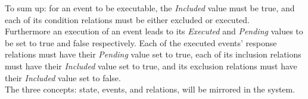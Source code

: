 To sum up: for an event to be executable, the \textit{Included} value must be true, and each of its condition relations must be either excluded or executed. \\

Furthermore an execution of an event leads to its \textit{Executed} and \textit{Pending} values to be set to true and false respectively. Each of the executed events’ response relations must have their \textit{Pending} value set to true, each of its inclusion relations must have their \textit{Included} value set to true, and its exclusion relations must have their \textit{Included} value set to false. \\

The three concepts: state, events, and relations, will be mirrored in the system.
